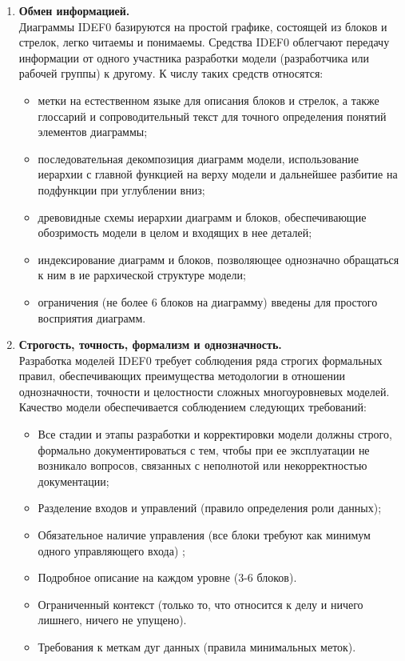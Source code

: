 \documentclass[a4paper, final]{article}
\begin{document}
\begin{enumerate}
	\item {\bf Обмен информацией.} \\
Диаграммы IDEF0 базируются на простой графике, состоящей из блоков и стрелок, легко читаемы и понимаемы. 
Средства IDEF0 облегчают передачу информации от одного участника разработки модели (разработчика или рабочей
группы) к другому. К числу таких средств относятся:
\begin{itemize}
\item метки на естественном языке для описания блоков и стрелок, а также глоссарий и сопроводительный текст для точного 
определения понятий элементов диаграммы;
\item последовательная декомпозиция диаграмм модели, использование иерархии с главной функцией на верху модели и 
дальнейшее разбитие на подфункции при углублении вниз;
\item древовидные схемы иерархии диаграмм и блоков, обеспечивающие обозримость модели в целом и входящих в нее деталей;
\item индексирование диаграмм и блоков, позволяющее однозначно обращаться к ним в ие рархической структуре модели;
\item ограничения (не более 6 блоков на диаграмму) введены для простого восприятия диаграмм.
\end{itemize}

	\item {\bf Строгость, точность, формализм и однозначность.} \\
Разработка моделей IDEF0 требует соблюдения ряда строгих формальных правил, обеспечивающих преимущества методологии 
в отношении однозначности, точности и целостности сложных многоуровневых моделей. Качество модели обеспечивается 
соблюдением следующих требований:
\begin{itemize}
\item Все стадии и этапы разработки и корректировки модели должны строго, формально документироваться с тем, чтобы при 
ее эксплуатации не возникало вопросов, связанных с неполнотой или некорректностью документации;
\item Разделение входов и управлений (правило определения роли данных);
\item Обязательное наличие управления (все блоки требуют как минимум одного управляющего входа) ;
\item Подробное описание на каждом уровне (3-6 блоков).
\item Ограниченный контекст (только то, что относится к делу и ничего лишнего, ничего не упущено).
\item Требования к меткам дуг данных (правила минимальных меток). 
\end{itemize}


\end{enumerate}
\end{document}
